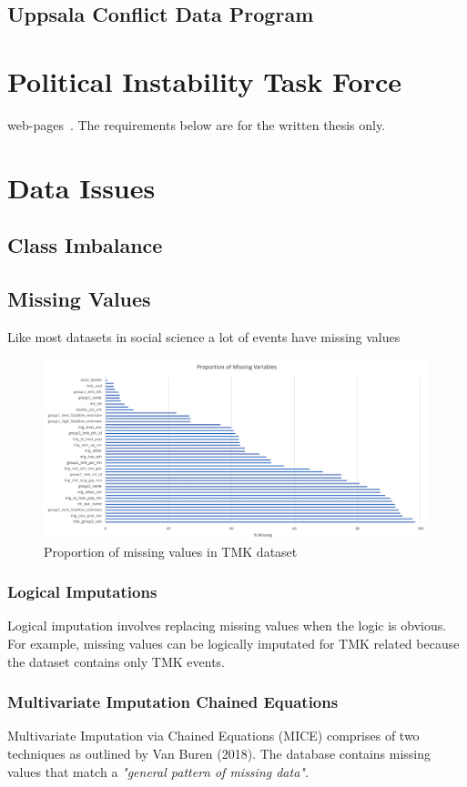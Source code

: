 \subsection{Uppsala Conflict Data Program}
\section{Political Instability Task Force}
web-pages~\cite{Noo05}.  The requirements below are for the written thesis
only.


\section{Data Issues}
\subsection{Class Imbalance}
\subsection{Missing Values}
Like most datasets in social science a lot of events have missing values

\begin{figure}[h]
\caption{Proportion of missing values in TMK dataset}
\centering
\includegraphics{proportionOfMissingvalues.png}
\end{figure}

\subsubsection{Logical Imputations}
Logical imputation involves replacing missing values when the logic is obvious. For example, missing values can be logically imputated for TMK related because the dataset contains only TMK events.

\subsubsection{Multivariate Imputation Chained Equations}
Multivariate Imputation via Chained Equations (MICE) comprises of two techniques as outlined by Van Buren (2018). The database contains missing values that match a \emph{"general pattern of missing data"}. 

